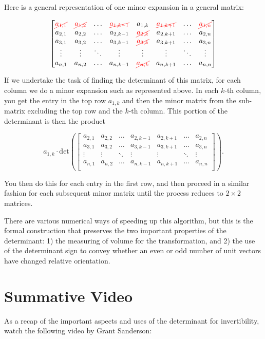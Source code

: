 \documentclass{ximera}
\begin{document}
Here is a general representation of one minor expansion in a general matrix:

\[
\begin{bmatrix}
    \textcolor{red}{\cancel{a_{1,1}}} & \textcolor{red}{\cancel{a_{1,2}}} & \ldots & \textcolor{red}{\cancel{a_{1,k-1}}} & a_{1,k} & \textcolor{red}{\cancel{a_{1,k+1}}} & \ldots & \textcolor{red}{\cancel{a_{1,n}}} \\
    a_{2,1} & a_{2,2} & \ldots & a_{2,k-1} & \textcolor{red}{\cancel{a_{2,k}}} & a_{2,k+1} & \ldots & a_{2,n} \\
    a_{3,1} & a_{3,2} & \ldots & a_{3,k-1} & \textcolor{red}{\cancel{a_{3,k}}} & a_{3,k+1} & \ldots & a_{3,n} \\
    \vdots & \vdots & \ddots & \vdots & \vdots & \vdots & \ddots & \vdots \\
    a_{n,1} & a_{n,2} & \ldots & a_{n,k-1} & \textcolor{red}{\cancel{a_{n,k}}} & a_{n,k+1} & \ldots & a_{n,n} \\
\end{bmatrix}
\]

If we undertake the task of finding the determinant of this matrix, for each column we do a minor expansion such as represented above. In each $k$-th column, you get the entry in the top row $a_{1,k}$ and then the minor matrix from the sub-matrix excluding the top row and the $k$-th column. This portion of the determinant is then the product

$$a_{1,k}\cdot\mbox{det}\left(
\begin{bmatrix}
    a_{2,1} & a_{2,2} & \ldots & a_{2,k-1} & a_{2,k+1} & \ldots & a_{2,n} \\
    a_{3,1} & a_{3,2} & \ldots & a_{3,k-1} & a_{3,k+1} & \ldots & a_{3,n} \\
    \vdots & \vdots & \ddots & \vdots & \vdots  & \ddots & \vdots \\
    a_{n,1} & a_{n,2} & \ldots & a_{n,k-1} & a_{n,k+1} & \ldots & a_{n,n} \\
\end{bmatrix}
\right).$$

You then do this for each entry in the first row, and then proceed in a similar fashion for each subsequent minor matrix until the process reduces to $2\times 2$ matrices. 

There are various numerical ways of speeding up this algorithm, but this is the formal construction that preserves the two important properties of the determinant: 1) the measuring of volume for the transformation, and 2) the use of the determinant sign to convey whether an even or odd number of unit vectors have changed relative orientation. 

\section*{Summative Video}

As a recap of the important aspects and uses of the determinant for invertibility, watch the following video by Grant Sanderson:

\begin{center}
\end{center}
\end{document}
